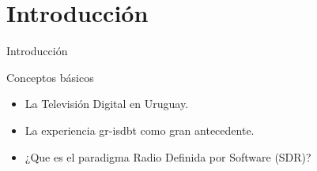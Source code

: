 \section{Introducción}

\begin{frame}{Introducción}
\begin{block}{Conceptos básicos}
	\begin{itemize}
		\item {	La Televisión Digital en Uruguay.}
		\item {	La experiencia gr-isdbt como gran antecedente. }
		\item {	¿Que es el paradigma Radio Definida por Software (SDR)?	}
	\end{itemize}
\end{block}

\end{frame}
